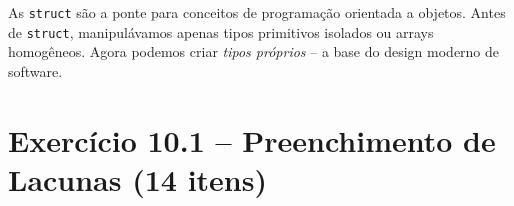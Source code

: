 \documentclass[12pt,a4paper]{article}
\begin{document}
\begin{boaprática}
  As \texttt{struct} são a ponte para conceitos de programação orientada a objetos.
  Antes de \texttt{struct}, manipulávamos apenas tipos primitivos isolados ou arrays
  homogêneos. Agora podemos criar \textit{tipos próprios} -- a base do design moderno
  de software.
\end{boaprática}

\tableofcontents\newpage

\section{Exercício 10.1 -- Preenchimento de Lacunas (14 itens)}
\end{document}
